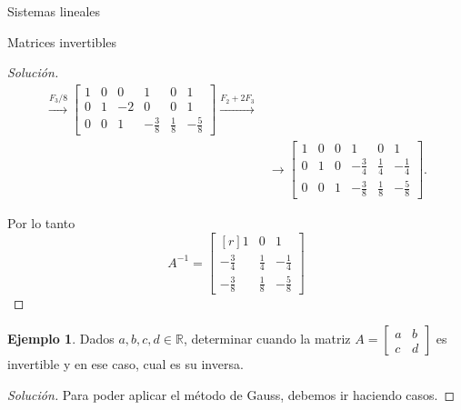 \documentclass[a4paper,12pt,twoside,spanish]{amsbook}
\theoremstyle{definition}
\newtheorem{ejemplo}{Ejemplo}[section]
\theoremstyle{remark}
\begin{document}
\begin{chapter}{Sistemas lineales}
\begin{section}{Matrices invertibles}
\begin{proof}[Solución]
\begin{align*}
				\stackrel{F_3/8}{\longrightarrow}
				\left[\begin{array}{rrr|rrr}	1&0&0&1&0&1\\ 0&1&-2&0&0&1 \\ 0&0&1&-\frac38&\frac18&-\frac58 \end{array}\right]
				\stackrel{F_2+2F_3}{\longrightarrow} \\
				&\longrightarrow
				\left[\begin{array}{rrr|rrr}	1&0&0&1&0&1\\ 0&1&0&-\frac34&\frac14&-\frac14 \\ 0&0&1&-\frac38&\frac18&-\frac58 \end{array}\right].
				\end{align*}
				
				Por lo tanto 
				\begin{equation*}
				A^{-1} = 	\begin{bmatrix*}[r]	1&0&1\\ -\frac34&\frac14&-\frac14 \\ -\frac38&\frac18&-\frac58 \end{bmatrix*}
				\end{equation*}
			\end{proof}
			
			\begin{ejemplo}\label{inv-2x2-0}
				Dados $a,b,c,d \in \mathbb R$, determinar cuando la matriz $A = \begin{bmatrix*} a&b\\c&d\end{bmatrix*}$  es invertible y en ese caso,  cual es su inversa. 
			\end{ejemplo}
			\begin{proof}[Solución] Para poder aplicar el método de Gauss, debemos ir haciendo casos. 
				

\end{proof}
\end{section}
\end{chapter}
\end{document}
